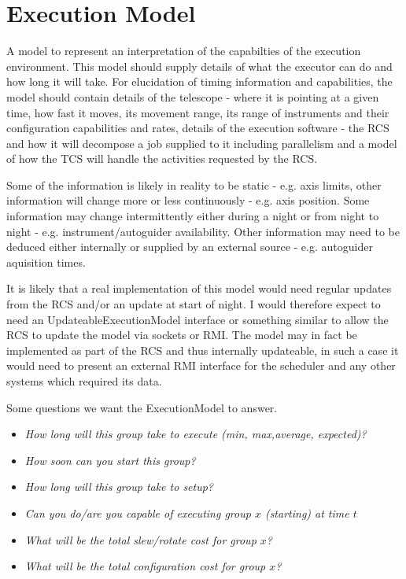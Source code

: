 \section{Execution Model} 
A model to represent an interpretation of the capabilties of the execution environment. This model should supply details of what the executor can do and how long it will take. For elucidation of timing information and capabilities, the model should contain details of the telescope - where it is pointing at a given time, how fast it moves, its movement range, its range of instruments and their configuration capabilities and rates, details of the execution software - the RCS and how it will decompose a job supplied to it including parallelism and a model of how the TCS will handle the activities requested by the RCS. 

Some of the information is likely in reality to be static - e.g. axis limits, other information will change more or less continuously - e.g. axis position. Some information may change intermittently either during a night or from night to night - e.g. instrument/autoguider availability. Other information may need to be deduced either internally or supplied by an external source - e.g. autoguider aquisition times.

It is likely that a real implementation of this model would need regular updates from the RCS and/or an update at start of night. I would therefore expect to need an \textsf{UpdateableExecutionModel} interface or something similar to allow the RCS to update the model via sockets or RMI. The model may in fact be implemented as part of the RCS and thus internally updateable, in such a case it would need to present an external RMI interface for the scheduler and any other systems which required its data.

Some questions we want the \textsf{ExecutionModel} to answer.

\begin{itemize}
\item \emph{How long will this group take to execute (min, max,average, expected)?}
\item \emph{How soon can you start this group?}
\item \emph{How long will this group take to setup?}
\item \emph{Can you do/are you capable of executing group $x$ (starting) at time $t$}
\item \emph{What will be the total slew/rotate cost for group $x$?}
\item \emph{What will be the total configuration cost for group $x$?}
\end{itemize}

